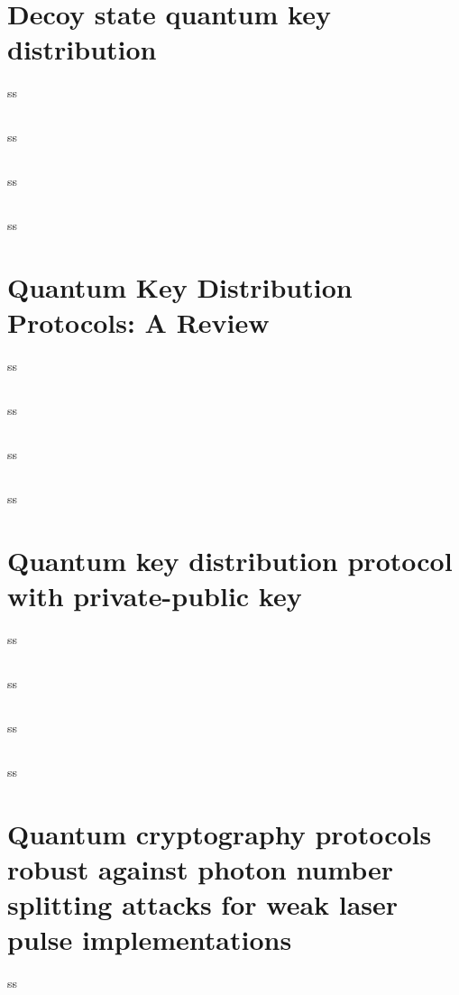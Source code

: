 \section{Decoy state quantum key distribution}
ss
\subsection*{\trnas}
ss
\subsection*{\review}
ss
\subsection*{\dic}
ss
\section{Quantum Key Distribution Protocols: A Review}
ss
\subsection*{\trnas}
ss
\subsection*{\review}
ss
\subsection*{\dic}
ss
\section{Quantum key distribution protocol with private-public key}
ss
\subsection*{\trnas}
ss
\subsection*{\review}
ss
\subsection*{\dic}
ss
\section{Quantum cryptography protocols robust against photon number splitting attacks for weak laser pulse implementations}
ss

